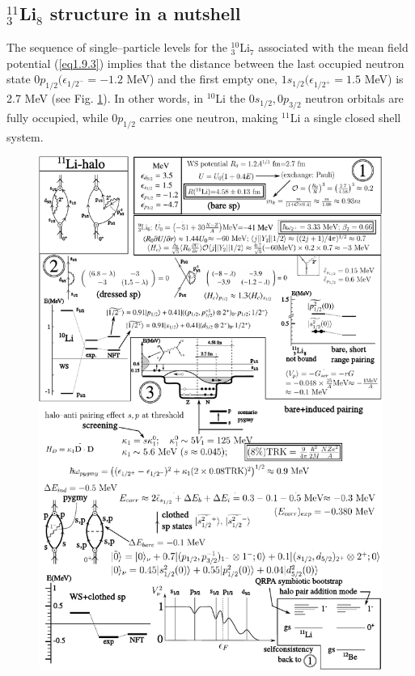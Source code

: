 \subsection{$^{11}_3$Li$_8$ structure in a nutshell}\label{S1.9.3}
The sequence of single--particle levels for the $^{10}_3$Li$_7$ associated with the mean field potential (\ref{eq1.9.3}) implies that the distance between the last occupied neutron state $0p_{1/2}(\epsilon_{1/2^-}=-1.2$ MeV) and  the first empty one, $1s_{1/2}(\epsilon_{1/2^+}=1.5$ MeV) is 2.7 MeV (see Fig. \ref{fig1.9.1}). In other words, in $^{10}$Li the $0s_{1/2},0p_{3/2}$ neutron orbitals are fully occupied, while $0p_{1/2}$ carries one neutron, making $^{11}$Li a single closed shell system.
     \begin{figure}
     \centerline {
     \includegraphics*[width=16cm]{introduccion/figs/fig1_9_1}
     }
     \caption{}
     \label{fig1.9.1}
     \end{figure}
